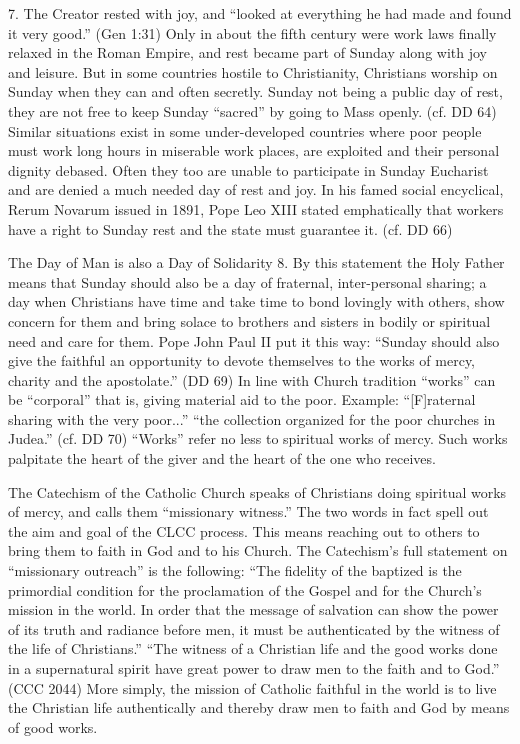 \documentclass[oneside]{book}
\begin{document}
7. The Creator rested with joy, and ``looked at everything he had made and found
it very good.'' (Gen 1:31) Only in about the fifth century were work laws
finally relaxed in the Roman Empire, and rest became part of Sunday along with
joy and leisure. But in some countries hostile to Christianity, Christians
worship on Sunday when they can and often secretly. Sunday not being a public
day of rest, they are not free to keep Sunday ``sacred'' by going to Mass
openly. (cf. DD 64)
Similar situations exist in some under-developed countries where poor people
must work long hours in miserable work places, are exploited and their personal
dignity debased. Often they too are unable to participate in Sunday Eucharist
and are denied a much needed day of rest and joy. In his famed social
encyclical, Rerum Novarum issued in 1891, Pope Leo XIII stated emphatically that
workers have a right to Sunday rest and the state must guarantee it. (cf. DD 66)

The Day of Man is also a Day of Solidarity
8. By this statement the Holy Father means that Sunday should also be a day of
fraternal, inter-personal sharing; a day when Christians have time and take time
to bond lovingly with others, show concern for them and bring solace to brothers
and sisters in bodily or spiritual need and care for them. Pope John Paul II put
it this way: ``Sunday should also give the faithful an opportunity to devote
themselves to the works of mercy, charity and the apostolate.'' (DD 69) In line
with Church tradition ``works'' can be ``corporal'' that is, giving material aid
to the poor. Example: ``[F]raternal sharing with the very poor...'' ``the
collection organized for the poor churches in Judea.'' (cf. DD 70) ``Works''
refer no less to spiritual works of mercy. Such works palpitate the heart of the
giver and the heart of the one who receives.

The Catechism of the Catholic Church speaks of Christians doing spiritual works
of mercy, and calls them ``missionary witness.'' The two words in fact spell out
the aim and goal of the CLCC process. This means reaching out to others to bring
them to faith in God and to his Church. The Catechism's full statement on
``missionary outreach'' is the following: ``The fidelity of the baptized is the
primordial condition for the proclamation of the Gospel and for the Church's
mission in the world. In order that the message of salvation can show the power
of its truth and radiance before men, it must be authenticated by the witness of
the life of Christians.'' ``The witness of a Christian life and the good works
done in a supernatural spirit have great power to draw men to the faith and to
God.'' (CCC 2044) More simply, the mission of Catholic faithful in the world is
to live the Christian life authentically and thereby draw men to faith and God
by means of good works.
\end{document}
